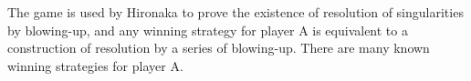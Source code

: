 \documentclass[12pt]{article}
\theoremstyle{definition}
\theoremstyle{plain}
\begin{document}
The game is used by Hironaka to prove the existence of resolution of singularities
by blowing-up, and any winning strategy for player A is equivalent to 
a construction of resolution by a series of blowing-up. 
There are many known winning strategies for player A. 
\cite{spivakovsky1983solution,zeillinger2006short,hauser2003hironaka}

% 
% 
% 
\end{document}
